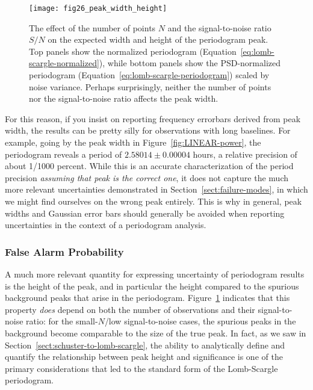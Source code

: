\documentclass[preprint]{aastex}
\newcommand{\fig}[1]{Figure~\ref{fig:#1}}
\newcommand{\figlabel}[1]{\label{fig:#1}}
\newcommand{\Eq}[1]{Equation~\ref{eq:#1}}
\newcommand{\eq}[1]{\Eq{#1}}
\newcommand{\Sect}[1]{Section~\ref{sect:#1}}
\newcommand{\sect}[1]{\Sect{#1}}
\newcommand{\sectlabel}[1]{\label{sect:#1}}
\begin{document}
\begin{figure}[ht]
  \centering
  \texttt{[image: fig26\_peak\_width\_height]}
  \caption{The effect of the number of points $N$ and the signal-to-noise
    ratio $S/N$ on the expected width and height of the periodogram peak.
    Top panels show the normalized periodogram (\eq{lomb-scargle-normalized}),
    while bottom panels show the PSD-normalized periodogram
    (\eq{lomb-scargle-periodogram}) scaled by noise variance.
    Perhaps surprisingly, neither the number of points nor the signal-to-noise
    ratio affects the peak width. \figlabel{peak-width-height}}
\end{figure}

For this reason, if you insist on reporting frequency errorbars derived from
peak width, the results can be pretty silly for observations with
long baselines.
For example, going by the peak width in \fig{LINEAR-power}, the
periodogram reveals a period of $2.58014 \pm 0.00004$ hours, a relative
precision of about 1/1000 percent.
While this is an accurate characterization of the period precision
{\it assuming that peak is the correct one}, it does not capture the
much more relevant uncertainties demonstrated in \sect{failure-modes},
in which we might find ourselves on the wrong peak entirely.
This is why in general, peak widths and Gaussian error bars should generally
be avoided when reporting uncertainties in the context of a periodogram
analysis.

\subsubsection{False Alarm Probability}
\sectlabel{false-alarm-probability}

A much more relevant quantity for expressing uncertainty of periodogram results
is the height of the peak, and in particular the height compared to the
spurious background peaks that arise in the periodogram.
\fig{peak-width-height} indicates that this property {\it does} depend on
both the number of observations and their signal-to-noise ratio: for the
small-$N$/low signal-to-noise cases, the spurious peaks in the background
become comparable to the size of the true peak.
In fact, as we saw in \sect{schuster-to-lomb-scargle}, the ability to
analytically define and quantify the relationship between peak height
and significance is one of the primary considerations that led to the
standard form of the Lomb-Scargle periodogram.
\end{document}
